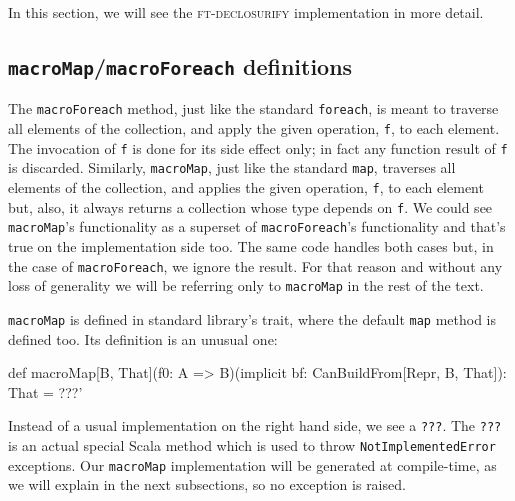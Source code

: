 In this section, we will see the \textsc{ft-declosurify} implementation in more detail.

\subsection{ \texttt{macroMap}/\texttt{macroForeach} definitions}

The \texttt{macroForeach} method, just like the standard \texttt{foreach}, is meant to traverse
all elements of the collection, and apply the given operation, \texttt{f}, to each
element. The invocation of \texttt{f} is done for its side effect only; in fact any
function result of \texttt{f} is discarded. Similarly, \texttt{macroMap}, just like the standard
\texttt{map}, traverses all elements of the collection, and applies the given operation,
\texttt{f}, to each element but, also, it always returns a collection whose type depends
on \texttt{f}. We could see \texttt{macroMap}'s functionality as a superset of \texttt{macroForeach}'s
functionality and that's true on the implementation side too. The same code
handles both cases but, in the case of \texttt{macroForeach}, we ignore the result. For
that reason and without any loss of generality we will be referring only to
\texttt{macroMap} in the rest of the text.

\texttt{macroMap} is defined in standard library's  trait, where the
default \texttt{map} method is defined too. Its definition is an unusual one:

\begin{scalaCode}
def macroMap[B, That](f0: A => B)(implicit bf: CanBuildFrom[Repr, B, That]): That = ???'
\end{scalaCode}

Instead of a usual implementation on the right hand side, we see a \texttt{???}. The \texttt{???}
is an actual special Scala method which is used to throw \texttt{NotImplementedError}
exceptions. Our \texttt{macroMap} implementation will be generated at compile-time, as
we will explain in the next subsections, so no exception is raised.

